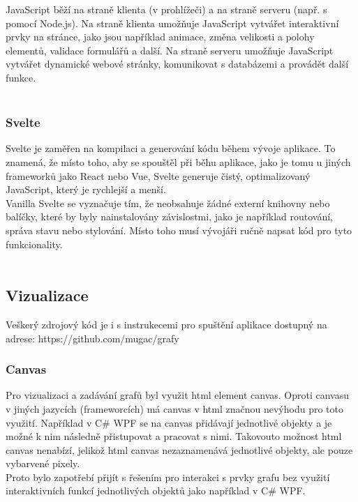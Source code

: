 \documentclass[12pt, titlepage, a4paper]{article}
\begin{document}
JavaScript běží na straně klienta (v prohlížeči) a na straně serveru (např. s pomocí Node.js). Na 
straně klienta umožňuje JavaScript vytvářet interaktivní prvky na stránce, jako jsou například 
animace, změna velikosti a polohy elementů, validace formulářů a další. Na straně serveru umožňuje 
JavaScript vytvářet dynamické webové stránky, komunikovat s databázemi a provádět další funkce.
\\

~\cite{Mozilla: JavaScript}
\subsubsection{Svelte}
Svelte je zaměřen na kompilaci a generování kódu během vývoje aplikace. To znamená, že místo toho, 
aby se spouštěl při běhu aplikace, jako je tomu u jiných frameworků jako React nebo Vue, Svelte 
generuje čistý, optimalizovaný JavaScript, který je rychlejší a menší.
\\

Vanilla Svelte se vyznačuje tím, že neobsahuje žádné externí knihovny nebo balíčky, které by 
byly nainstalovány závislostmi, jako je například routování, správa stavu nebo stylování. Místo 
toho musí vývojáři ručně napsat kód pro tyto funkcionality.
\\

~\cite{Svelte docs}
\clearpage
\subsection{Vizualizace}
Veškerý zdrojový kód je i s instrukecemi pro spuštění aplikace dostupný na adrese: https://github.com/mugac/grafy
\subsubsection{Canvas}
Pro vizualizaci a zadávání grafů byl využit html element canvas. Oproti 
canvasu v jiných jazycích (frameworcích) má canvas v html značnou nevýhodu
pro toto využití. Například v C\# WPF se na canvas přidávají jednotlivé objekty
a je možné k nim následně přistupovat a pracovat s nimi. Takovouto možnost html 
canvas nenabízí, jelikož html canvas nezaznamenává jednotlivé objekty, ale pouze
vybarvené pixely.
\\

Proto bylo zapotřebí přijít s řešením pro interakci s prvky grafu bez využití
interaktivních funkcí jednotlivých objektů jako například v C\# WPF.
\\
\end{document}
